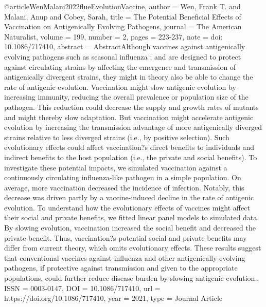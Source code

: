 {{{@article{WenMalani2022flueEvolutionVaccine,
   author = {Wen, Frank T. and Malani, Anup and Cobey, Sarah},
   title = {The Potential Beneficial Effects of Vaccination on Antigenically Evolving Pathogens},
   journal = {The American Naturalist},
   volume = {199},
   number = {2},
   pages = {223-237},
   note = {doi: 10.1086/717410},
   abstract = {AbstractAlthough vaccines against antigenically evolving pathogens such as seasonal influenza ; and are designed to protect against circulating strains by affecting the emergence and transmission of antigenically divergent strains, they might in theory also be able to change the rate of antigenic evolution. Vaccination might slow antigenic evolution by increasing immunity, reducing the overall prevalence or population size of the pathogen. This reduction could decrease the supply and growth rates of mutants and might thereby slow adaptation. But vaccination might accelerate antigenic evolution by increasing the transmission advantage of more antigenically diverged strains relative to less diverged strains (i.e., by positive selection). Such evolutionary effects could affect vaccination?s direct benefits to individuals and indirect benefits to the host population (i.e., the private and social benefits). To investigate these potential impacts, we simulated vaccination against a continuously circulating influenza-like pathogen in a simple population. On average, more vaccination decreased the incidence of infection. Notably, this decrease was driven partly by a vaccine-induced decline in the rate of antigenic evolution. To understand how the evolutionary effects of vaccines might affect their social and private benefits, we fitted linear panel models to simulated data. By slowing evolution, vaccination increased the social benefit and decreased the private benefit. Thus, vaccination?s potential social and private benefits may differ from current theory, which omits evolutionary effects. These results suggest that conventional vaccines against influenza and other antigenically evolving pathogens, if protective against transmission and given to the appropriate populations, could further reduce disease burden by slowing antigenic evolution.},
   ISSN = {0003-0147},
   DOI = {10.1086/717410},
   url = {https://doi.org/10.1086/717410},
   year = {2021},
   type = {Journal Article}
}

}}}
